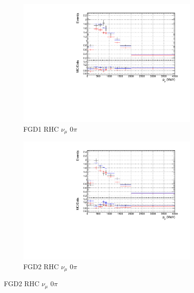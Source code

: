 \begin{figure}[!h]
\begin{subfigure}{0.49\textwidth}
  \centering
  \includegraphics[width=\textwidth]{figs/priorpred1D_p_FGD1_NuMuBkg_CC0pi_in_AntiNu_Mode}
  \caption{FGD1 RHC $\nu_{\mu}$ 0$\pi$}
\end{subfigure}
\begin{subfigure}{0.49\textwidth}
  \centering
  \includegraphics[width=\textwidth]{figs/priorpred1D_p_FGD2_NuMuBkg_CC0pi_in_AntiNu_Mode}
  \caption{FGD2 RHC $\nu_{\mu}$ 0$\pi$}
\end{subfigure}


\end{figure}
